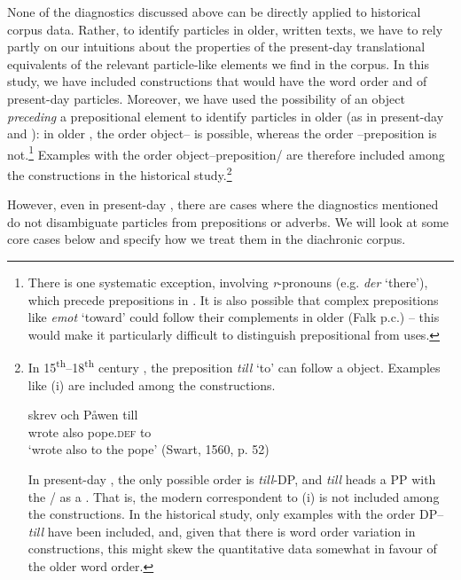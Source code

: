 \documentclass[output=paper]{langscibook}
\begin{document}
None of the diagnostics discussed above can be directly applied to historical corpus data. Rather, to identify particles in older, written texts, we have to rely partly on our intuitions about the properties of the present-day  translational equivalents of the relevant particle-like elements we find in the corpus. In this study, we have included constructions that would have the word order and  of present-day  particles. Moreover, we have used the possibility of an object \textit{preceding} a prepositional element to identify particles in older  (as in present-day  and ): in older , the order object– is possible, whereas the order –preposition is not.\footnote{There is one systematic exception, involving \textit{r}{}-pronouns (e.g. \textit{der} ‘there’), which precede prepositions in  \citep{Delsing2014Svenskans}. It is also possible that complex prepositions like \textit{emot} ‘toward’ could follow their complements in older  (Falk p.c.) – this would make it particularly difficult to distinguish prepositional from  uses.}  Examples with the order object–preposition/ are therefore included among the  constructions in the historical study.\footnote{In
    15\textsuperscript{th}--18\textsuperscript{th} century , the preposition \textit{till} ‘to’ can follow a  object. Examples like (i) are included among the  constructions.

    \ea
    \gll skrev   och   Påwen   till\\
    wrote   also  pope.\textsc{def}   to\\
    \glt ‘wrote also to the pope’ (Swart, 1560, p. 52)
    \z

    In present-day , the only possible order is \textit{till}-DP, and \textit{till} heads a PP with the / as a . That is, the modern correspondent to (i) is not included among the  constructions. In the historical study, only examples with the order DP–\textit{till} have been included, and, given that there is word order variation in  constructions, this might skew the quantitative data somewhat in favour of the older word order.
}



However, even in present-day , there are cases where the diagnostics mentioned do not disambiguate particles from prepositions or adverbs. We will look at some core cases below and specify how we treat them in the diachronic corpus.
\end{document}
